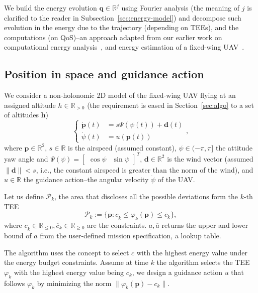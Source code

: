 \documentclass[letterpaper,10pt,conference]{ieeeconf}
\begin{document}
We build the energy evolution $\mathbf{q}\in\mathbb{R}^j$ using Fourier analysis (the meaning of $j$ is clarified to the reader in Subsection~\ref{sec:energy-model}) and decompose such evolution in the energy due to the trajectory (depending on TEEs), and the computations (on QoS)--an approach adapted from our earlier work on computational energy analysis~\cite{seewald2019coarse, seewald2019component}, and energy estimation of a fixed-wing UAV~\cite{seewald2020mechanical}.

\subsection{Position in space and guidance action}
\label{sec:position}

We consider a non-holonomic 2D model of the fixed-wing UAV flying at an assigned altitude $h\in\mathbb{R}_{>0}$ (the requirement is eased in Section~\ref{sec:algo} to a set of altitudes $\mathbf{h}$)
\begin{equation}\label{eq:uav-kinem}\begin{cases}
  \dot{\mathbf{p}}(t)&=s\Psi(\psi(t))+\mathbf{d}(t)\\
  \dot{\psi}(t)&=u(\mathbf{p}(t))
\end{cases},
\end{equation}
where $\mathbf{p}\in\mathbb{R}^2$, $s\in\mathbb{R}$ is the airspeed (assumed constant), $\psi\in(-\pi,\pi]$ the attitude yaw angle and $\Psi(\psi)=\begin{bmatrix}\cos{\psi} & \sin{\psi}\end{bmatrix}^T$, $\mathbf{d}\in\mathbb{R}^2$ is the wind vector (assumed $\|\mathbf{d}\|<s$, i.e., the constant airspeed is greater than the norm of the wind), and $u\in\mathbb{R}$ the guidance action--the angular velocity $\dot{\psi}$ of the UAV.

Let us define $\mathcal{P}_k$, the area that discloses all the possible deviations form the $k$-th TEE 
\begin{equation}\label{eq:area}
  \mathcal{P}_k:=\{\mathbf{p}:\underline{c}_k\leq\varphi_k(\mathbf{p})\leq\overline{c}_k\},
\end{equation}
where $\underline{c}_k\in\mathbb{R}_{\leq 0},\overline{c}_k\in\mathbb{R}_{\geq 0}$ are the constraints. $\underline{a},\overline{a}$ returns the upper and lower bound of $a$ from the user-defined mission specification, a lookup table.

The algorithm uses the concept to select $c$ with the highest energy value under the energy budget constraints. Assume at time $k$ the algorithm selects the TEE $\varphi_k$ with the highest energy value being $c_k$, we design a guidance action $u$ that follows $\varphi_k$ by minimizing the norm $\|\varphi_k(\mathbf{p})-c_k\|$.
\end{document}
